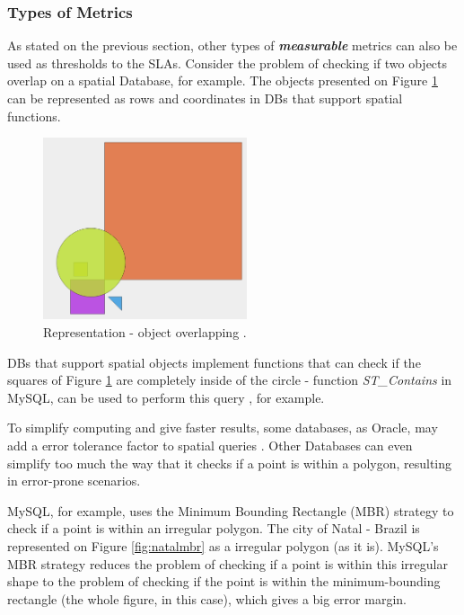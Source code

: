 \subsubsection{Types of Metrics} 
\label{typesOfMetrics}
As stated on the previous section, other types of \textbf{\textit{measurable}} metrics can also be used as thresholds to the SLAs. Consider the problem of checking if two objects overlap on a spatial Database, for example. The objects presented on Figure \ref{fig:objectoverlap} can be represented as rows and coordinates in DBs that support spatial functions. 

\begin{figure}[ht!]
\centering
\includegraphics[width=60mm]{Imagens/objectOverLap.png}
\caption{Representation - object overlapping \cite{mysqlspatial}. \label{fig:objectoverlap}}
\end{figure}

DBs that support spatial objects implement functions that can check if the squares of Figure \ref{fig:objectoverlap} are completely inside of the circle - function  \textit{ST\_Contains} in MySQL, can be used to perform this query \cite{mysqlspatial}, for example. 

To simplify computing and give faster results, some databases, as Oracle, may add a error tolerance factor to spatial queries \cite{oracletolerance}. Other Databases  can even simplify too much the way that it checks if a point is within a polygon, resulting in error-prone scenarios. 

MySQL, for example, uses the Minimum Bounding Rectangle (MBR) strategy to check if a point is within an irregular polygon. The city of Natal - Brazil is represented on Figure \ref{fig:natalmbr} as a irregular polygon (as it is). MySQL's MBR strategy reduces the problem of checking if a point is within this irregular shape to the problem of checking if the point is within the minimum-bounding rectangle (the whole figure, in this case), which gives a big error margin.

